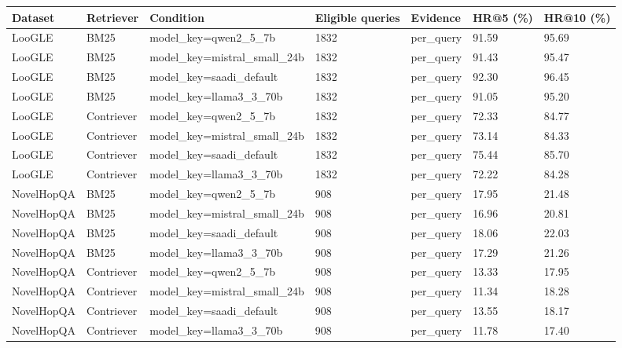 \begin{tabular}{lllllll}
\hline
Dataset & Retriever & Condition & Eligible queries & Evidence & HR@5 (\%) & HR@10 (\%) \\
\hline
LooGLE & BM25 & model\_key=qwen2\_5\_7b & 1832 & per\_query & 91.59 & 95.69 \\
LooGLE & BM25 & model\_key=mistral\_small\_24b & 1832 & per\_query & 91.43 & 95.47 \\
LooGLE & BM25 & model\_key=saadi\_default & 1832 & per\_query & 92.30 & 96.45 \\
LooGLE & BM25 & model\_key=llama3\_3\_70b & 1832 & per\_query & 91.05 & 95.20 \\
LooGLE & Contriever & model\_key=qwen2\_5\_7b & 1832 & per\_query & 72.33 & 84.77 \\
LooGLE & Contriever & model\_key=mistral\_small\_24b & 1832 & per\_query & 73.14 & 84.33 \\
LooGLE & Contriever & model\_key=saadi\_default & 1832 & per\_query & 75.44 & 85.70 \\
LooGLE & Contriever & model\_key=llama3\_3\_70b & 1832 & per\_query & 72.22 & 84.28 \\
NovelHopQA & BM25 & model\_key=qwen2\_5\_7b & 908 & per\_query & 17.95 & 21.48 \\
NovelHopQA & BM25 & model\_key=mistral\_small\_24b & 908 & per\_query & 16.96 & 20.81 \\
NovelHopQA & BM25 & model\_key=saadi\_default & 908 & per\_query & 18.06 & 22.03 \\
NovelHopQA & BM25 & model\_key=llama3\_3\_70b & 908 & per\_query & 17.29 & 21.26 \\
NovelHopQA & Contriever & model\_key=qwen2\_5\_7b & 908 & per\_query & 13.33 & 17.95 \\
NovelHopQA & Contriever & model\_key=mistral\_small\_24b & 908 & per\_query & 11.34 & 18.28 \\
NovelHopQA & Contriever & model\_key=saadi\_default & 908 & per\_query & 13.55 & 18.17 \\
NovelHopQA & Contriever & model\_key=llama3\_3\_70b & 908 & per\_query & 11.78 & 17.40 \\
\hline
\end{tabular}
